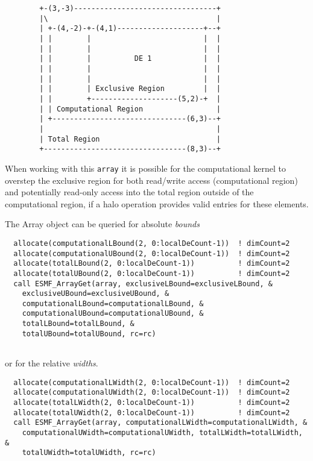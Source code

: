    \begin{verbatim}
        +-(3,-3)---------------------------------+ 
        |\                                       | 
        | +-(4,-2)-+-(4,1)--------------------+--+ 
        | |        |                          |  | 
        | |        |                          |  | 
        | |        |          DE 1            |  | 
        | |        |                          |  | 
        | |        |                          |  | 
        | |        | Exclusive Region         |  | 
        | |        +--------------------(5,2)-+  | 
        | | Computational Region                 | 
        | +-------------------------------(6,3)--+ 
        |                                        | 
        | Total Region                           | 
        +---------------------------------(8,3)--+ 
   \end{verbatim}
  
   When working with this {\tt array} it is possible for the computational
   kernel to overstep the exclusive region for both read/write access 
   (computational region) and potentially read-only access into the total region
   outside of the computational region, if a halo operation provides valid 
   entries for these elements. 
  
   The Array object can be queried for absolute {\em bounds} 

 \begin{verbatim}
  allocate(computationalLBound(2, 0:localDeCount-1))  ! dimCount=2
  allocate(computationalUBound(2, 0:localDeCount-1))  ! dimCount=2
  allocate(totalLBound(2, 0:localDeCount-1))          ! dimCount=2
  allocate(totalUBound(2, 0:localDeCount-1))          ! dimCount=2
  call ESMF_ArrayGet(array, exclusiveLBound=exclusiveLBound, &
    exclusiveUBound=exclusiveUBound, &
    computationalLBound=computationalLBound, &
    computationalUBound=computationalUBound, &
    totalLBound=totalLBound, &
    totalUBound=totalUBound, rc=rc)
 
\end{verbatim}
 

   or for the relative {\em widths}. 

 \begin{verbatim}
  allocate(computationalLWidth(2, 0:localDeCount-1))  ! dimCount=2
  allocate(computationalUWidth(2, 0:localDeCount-1))  ! dimCount=2
  allocate(totalLWidth(2, 0:localDeCount-1))          ! dimCount=2
  allocate(totalUWidth(2, 0:localDeCount-1))          ! dimCount=2
  call ESMF_ArrayGet(array, computationalLWidth=computationalLWidth, &
    computationalUWidth=computationalUWidth, totalLWidth=totalLWidth, &
    totalUWidth=totalUWidth, rc=rc)
 
\end{verbatim}
 
